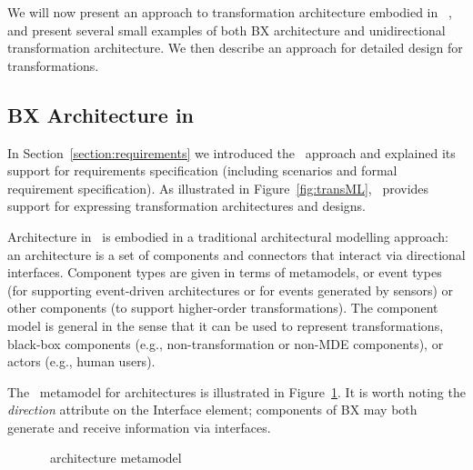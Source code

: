 We will now present an approach to transformation architecture embodied in \transml\ , and present several small examples of both BX architecture and unidirectional transformation architecture. We then describe an approach for detailed design for transformations.

\subsection{BX Architecture in \transml\ }
In Section~\ref{section:requirements} we introduced the \transml\ approach and explained its support for requirements specification (including scenarios and formal requirement specification). As illustrated  in Figure~\ref{fig:transML}, \transml\ provides support for expressing transformation architectures and designs. 

Architecture in \transml\ is embodied in a traditional architectural modelling approach: an architecture is a set of components and connectors that interact via directional interfaces. Component types are given in terms of metamodels, or event types (for supporting event-driven architectures or for events generated by sensors) or other components (to support higher-order transformations). The component model is general in the sense that it can be used to represent transformations, black-box components (e.g., non-transformation or non-MDE components), or actors (e.g., human users). 

The \transml\ metamodel for architectures is illustrated in Figure~\ref{fig:transml-architecture}. It is worth noting the \textit{direction} attribute on the Interface element; components of BX may both generate and receive  information via interfaces.

\begin{figure}[htbp]
\caption{\transml\ architecture metamodel}
\label{fig:transml-architecture}
\end{figure}

